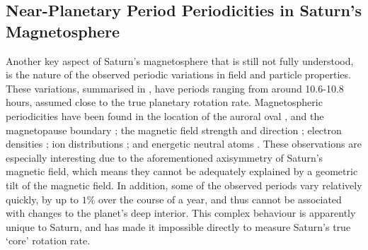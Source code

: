 \subsection{Near-Planetary Period Periodicities in Saturn's Magnetosphere}\label{intro:sec:periodicities}
Another key aspect of Saturn's magnetosphere that is still not fully understood, is the nature of the observed periodic variations in field and particle properties. These variations, summarised in \citet{carbary2013}, have periods ranging from around 10.6-10.8 hours, assumed close to the true planetary rotation rate. Magnetospheric periodicities have been found in the location of the auroral oval \citep{provan2009b}, and the magnetopause boundary \citep{clarke2010}; the magnetic field strength and direction \citep{espinosa2000, andrews2008}; electron densities \citep{morooka2009}; ion distributions \citep{burch2009}; and energetic neutral atoms \citep{paranicas2005}. These observations are especially interesting due to the aforementioned axisymmetry of Saturn's magnetic field, which means they cannot be adequately explained by a geometric tilt of the magnetic field. In addition, some of the observed periods vary relatively quickly, by up to $1\%$ over the course of a year, and thus cannot be associated with changes to the planet's deep interior. This complex behaviour is apparently unique to Saturn, and has made it impossible directly to measure Saturn's true `core' rotation rate.

